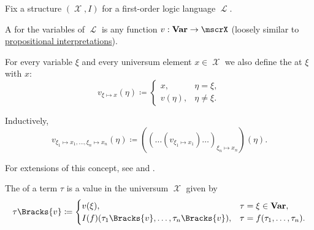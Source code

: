 \begin{definition}\label{def:first_order_valuation}
  Fix a structure \( (\mscrX, I) \) for a first-order logic language \( \mscrL \).

  \begin{thmenum}
     A  for the variables of \( \mscrL \) is any function \( v: \boldop{Var} \to \mscrX \) (loosely similar to \hyperref[def:propositional_valuation/interpretation]{propositional interpretations}).

     For every variable \( \xi \) and every universum element \( x \in \mscrX \) we also define the  at \( \xi \) with \( x \):
    \begin{equation*}
      v_{\xi \mapsto x}(\eta) \coloneqq \begin{cases}
        x,       &\eta = \xi, \\
        v(\eta), &\eta \neq \xi.
      \end{cases}
    \end{equation*}

    Inductively\IND,
    \begin{equation*}
      v_{\xi_1 \mapsto x_1, \ldots, \xi_n \mapsto x_n}(\eta) \coloneqq ((\ldots(v_{\xi_1 \mapsto x_1})\ldots)_{\xi_n \mapsto x_n})(\eta).
    \end{equation*}

    For extensions of this concept, see  and .

     The  of a term \( \tau \) is a value in the universum \( \mscrX \) given by
    \begin{equation}\label{eq:def:first_order_valuation/term_valuation}
      \tau\Bracks{v} \coloneqq \begin{cases}
        v(\xi),                                     &\tau = \xi \in \boldop{Var}, \\
        I(f)(\tau_1\Bracks{v}, \ldots, \tau_n\Bracks{v}), &\tau = f(\tau_1, \ldots, \tau_n).
      \end{cases}
    \end{equation}


\end{thmenum}
\end{definition}
